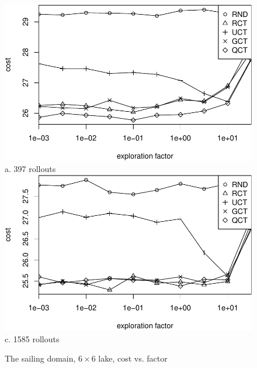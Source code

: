 \documentclass[letterpaper]{article}
\begin{document}
\begin{figure}[t]
  \centering
  \includegraphics[scale=0.45]{costs-size=6-nsamples=397.pdf}\\
  a. 397 rollouts\\
  \vspace{1em}
  \includegraphics[scale=0.45]{costs-size=6-nsamples=1585.pdf}\\
  c. 1585 rollouts
  \caption{The sailing domain, $6\times 6$ lake, cost vs. factor}
  \label{fig:sailing-cost-vs-factor}
\end{figure}
\end{document}
